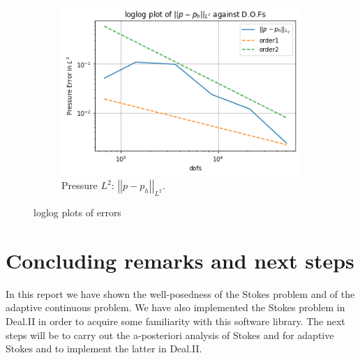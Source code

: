 \documentclass[12pt,a4paper]{article}
\theoremstyle{definition}
\begin{document}
\begin{figure}[H]
\begin{subfigure}[b]{.45\linewidth}
		\includegraphics[width=\linewidth]{p_h_L2}
		\caption{Pressure $L^2$: $\left|\left|p-p_h\right|\right|_{L^2}$.}
		\label{fig_pL2}
	\end{subfigure}
	\caption{loglog plots of errors }
	\label{fig_errors}
\end{figure}
\section{Concluding remarks and next steps}\label{sec_conclusion}
In this report we have shown the well-posedness of the Stokes problem and of the adaptive continuous problem.  We have also implemented the Stokes problem in Deal.II in order to acquire some familiarity with this software library.  The next steps will be to carry out the a-posteriori analysis of Stokes and for adaptive Stokes and to implement the latter  in Deal.II.  



\end{document}
